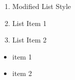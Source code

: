 

    \begin{enumerate}
        \item Modified List Style
        \item List Item 1
        \item List Item 2
    \end{enumerate}
    \begin{itemize}
        \item item 1
        \item item 2
    \end{itemize}


